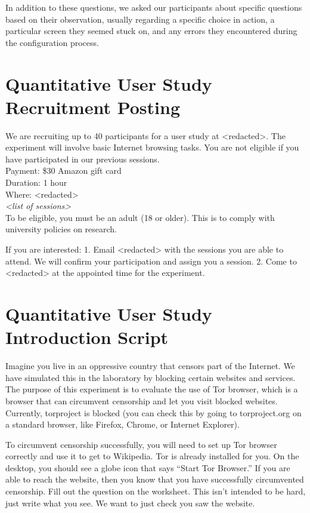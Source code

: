 \documentclass[USenglish,oneside,twocolumn]{article}
\begin{document}
In addition to these questions, we asked our participants about specific questions based on their observation, usually regarding a specific choice in action, a particular screen they seemed stuck on, and any errors they encountered during the configuration process. 

\section{Quantitative User Study Recruitment Posting}
\label{quantitative-recruitment}
We are recruiting up to 40 participants for a user study at <redacted>. %
The experiment will involve basic Internet browsing tasks. You are not eligible if you have participated in our previous sessions.\\

\indent Payment: \$30 Amazon gift card\\
\indent Duration: 1 hour \\
\indent Where: <redacted> \\ %

\textit{<list of sessions>}\\

To be eligible, you must be an adult (18 or older). This is to comply with university policies on research. 

If you are interested: 1. Email <redacted> %
with the sessions you are able to attend. We will confirm your participation and assign you a session. 
2. Come to <redacted> %
at the appointed time for the experiment.

\section{Quantitative User Study Introduction Script} 
\label{quantitative-script} 
Imagine you live in an oppressive country that censors part of the Internet. We have simulated this in the laboratory by blocking certain websites and services.  The purpose of this experiment is to evaluate the use of Tor browser, which is a browser that can circumvent censorship and let you visit blocked websites. Currently, torproject is blocked (you can check this by going to torproject.org on a standard browser, like Firefox, Chrome, or Internet Explorer). 

To circumvent censorship successfully, you will need to set up Tor browser correctly and use it to get to Wikipedia. Tor is already installed for you. On the desktop, you should see a globe icon that says ``Start Tor Browser.'' If you are able to reach the website, then you know that you have successfully circumvented censorship. Fill out the question on the worksheet. This isn't intended to be hard, just write what you see. We want to just check you saw the website. 
\end{document}
